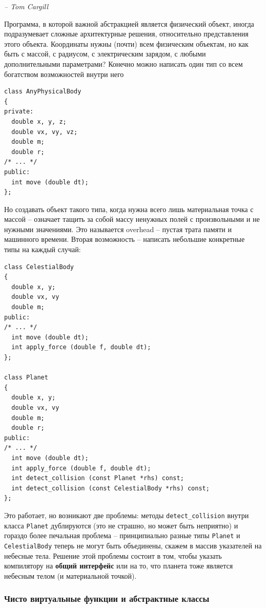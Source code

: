\documentclass[a4paper,12pt,oneside]{article}
\begin{document}
\hfill\textit{-- Tom Cargill}

Программа, в которой важной абстракцией является физический объект, иногда подразумевает сложные архитектурные решения, относительно представления этого объекта. Координаты нужны (почти) всем физическим объектам, но как быть с массой, с радиусом, с электрическим зарядом, с любыми дополнительными параметрами? Конечно можно написать один тип со всем богатством возможностей внутри него

\begin{lstlisting}
class AnyPhysicalBody
{
private:
  double x, y, z;
  double vx, vy, vz;
  double m;
  double r;
/* ... */
public:
  int move (double dt);
};
\end{lstlisting}

Но создавать объект такого типа, когда нужна всего лишь материальная точка с массой -- означает тащить за собой массу ненужных полей с произвольными и не нужными значениями. Это называется overhead -- пустая трата памяти и машинного времени. Вторая возможность -- написать небольшие конкретные типы на каждый случай:

\begin{lstlisting}
class CelestialBody
{
  double x, y;
  double vx, vy
  double m;
public:
/* ... */
  int move (double dt);
  int apply_force (double f, double dt);
};

class Planet
{
  double x, y;
  double vx, vy
  double m;
  double r;
public:
/* ... */
  int move (double dt);
  int apply_force (double f, double dt);
  int detect_collision (const Planet *rhs) const;
  int detect_collision (const CelestialBody *rhs) const;
};
\end{lstlisting}

Это работает, но возникают две проблемы: методы \lstinline!detect_collision! внутри класса \lstinline!Planet! дублируются (это не страшно, но может быть неприятно) и гораздо более печальная проблема -- принципиально разные типы \lstinline!Planet! и \lstinline!CelestialBody! теперь не могут быть объединены, скажем в массив указателей на небесные тела. Решение этой проблемы состоит в том, чтобы указать компилятору на \textbf{общий интерфейс} или на то, что планета тоже является небесным телом (и материальной точкой).

\subsubsection{Чисто виртуальные функции и абстрактные классы}\label{PureVirtual}
\end{document}
